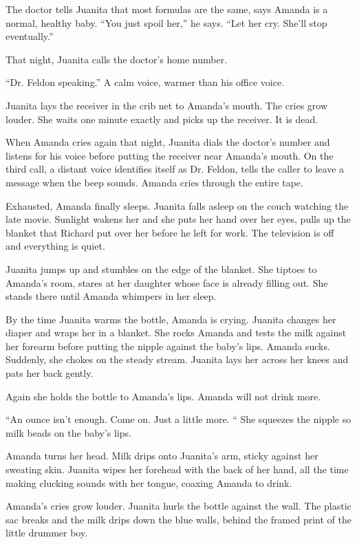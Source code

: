 \documentclass[twoside,10pt]{book}
\begin{document}
The doctor tells Juanita that most formulas are the same, says Amanda is
a normal, healthy baby. ``You just spoil her,'' he says. ``Let her cry.
She'll stop eventually.''

That night, Juanita calls the doctor's home number.

``Dr. Feldon speaking.'' A calm voice, warmer than his office voice.

Juanita lays the receiver in the crib net to Amanda's mouth. The cries
grow louder. She waits one minute exactly and picks up the receiver. It
is dead.

When Amanda cries again that night, Juanita dials the doctor's number
and listens for his voice before putting the receiver near Amanda's
mouth. On the third call, a distant voice identifies itself as Dr.
Feldon, tells the caller to leave a message when the beep sounds. Amanda
cries through the entire tape.

Exhausted, Amanda finally sleeps. Juanita falls asleep on the couch
watching the late movie. Sunlight wakens her and she puts her hand over
her eyes, pulls up the blanket that Richard put over her before he left
for work. The television is off and everything is quiet.

Juanita jumps up and stumbles on the edge of the blanket. She tiptoes to
Amanda's room, stares at her daughter whose face is already filling out.
She stands there until Amanda whimpers in her sleep.

By the time Juanita warms the bottle, Amanda is crying. Juanita changes
her diaper and wraps her in a blanket. She rocks Amanda and tests the
milk against her forearm before putting the nipple against the baby's
lips. Amanda sucks. Suddenly, she chokes on the steady stream. Juanita
lays her across her knees and pats her back gently.

Again she holds the bottle to Amanda's lips. Amanda will not drink more.

``An ounce isn't enough. Come on. Just a little more. `` She squeezes
the nipple so milk beads on the baby's lips.

Amanda turns her head. Milk drips onto Juanita's arm, sticky against her
sweating skin. Juanita wipes her forehead with the back of her hand, all
the time making clucking sounds with her tongue, coaxing Amanda to
drink.

Amanda's cries grow louder. Juanita hurls the bottle against the wall.
The plastic sac breaks and the milk drips down the blue walls, behind
the framed print of the little drummer boy.
\end{document}
